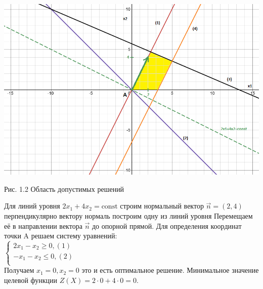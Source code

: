 \documentclass[a4paper, 12pt]{article}
\begin{document}
\includegraphics[width=\textwidth]{1-1.png}
\begin{center}
  Рис. 1.2 Область допустимых решений
\end{center}

Для линий уровня $2x_1+4x_2 = \text{const}$ строим нормальный вектор $\vec{n} = (2,4)$ перпендикулярно вектору нормаль построим одну из линий уровня Перемещаем её в направлении вектора $\vec{n}$ до опорной прямой. Для определения координат точки A решаем систему уравнений:\\

\begin{math}
  \begin{cases}
    2x_1-x_2 \geq 0,(1)\\
    -x_1-x_2 \leq 0,(2)\\
  \end{cases}
\end{math}\\

Получаем $x_1 = 0, x_2 = 0$ это и есть оптимальное решение. Минимальное значение целевой функции $Z(X) = 2 \cdot 0 + 4 \cdot 0 = 0$.
\end{document}
